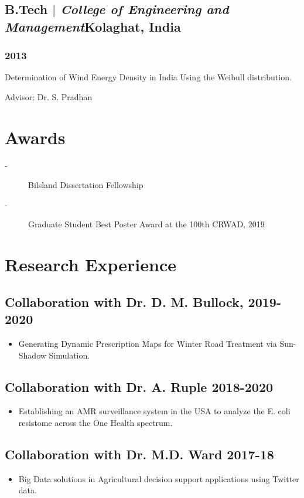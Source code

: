 \documentclass[10pt]{article}
\begin{document}
\subsection{B.Tech $|$ {\normalfont\textit{College of Engineering and Management}}\hfill Kolaghat, India}
\subsubsection{\hfill 2013}
\begin{description}
    \item Determination of Wind Energy Density in India Using the Weibull distribution.
    \item Advisor: Dr. S. Pradhan
\end{description}
\section{Awards}
\begin{description}
  \item[-]  Bilsland Dissertation Fellowship
  \item [-]Graduate Student Best Poster Award at the 100th CRWAD, 2019
\end{description}

\section{Research Experience}
\subsection{ Collaboration with Dr. D. M. Bullock,  \hfill 2019-2020}
\begin{itemize}
     \item[] Generating Dynamic Prescription Maps for Winter Road Treatment via Sun-Shadow Simulation.
\end{itemize}
\subsection{ Collaboration with Dr. A. Ruple \hfill 2018-2020}
\begin{itemize}
     \item[] Establishing an AMR surveillance system in the USA to analyze the E. coli resistome across the One Health
spectrum. 
\end{itemize}
\subsection{ Collaboration with Dr. M.D. Ward \hfill 2017-18}
\begin{itemize}
     \item[] Big Data solutions in Agricultural decision support applications using Twitter data. 
\end{itemize}
\end{document}
